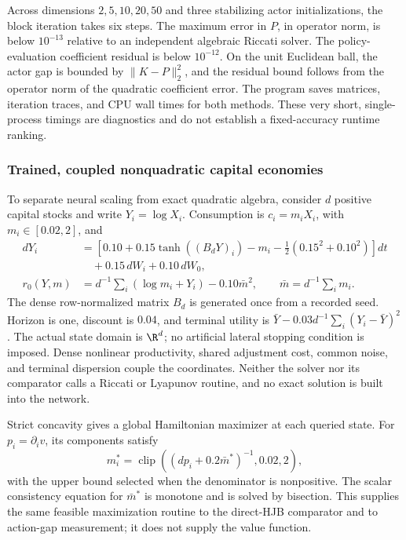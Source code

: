 Across dimensions $2,5,10,20,50$ and three stabilizing actor initializations, the block iteration takes six steps. The maximum error in $P$, in operator norm, is below $10^{-13}$ relative to an independent algebraic Riccati solver. The policy-evaluation coefficient residual is below $10^{-12}$. On the unit Euclidean ball, the actor gap is bounded by $\|K-P\|_2^2$, and the residual bound follows from the operator norm of the quadratic coefficient error. The program saves matrices, iteration traces, and CPU wall times for both methods. These very short, single-process timings are diagnostics and do not establish a fixed-accuracy runtime ranking.


\subsubsection{Trained, coupled nonquadratic capital economies}\label{sec:coupled-neural}
To separate neural scaling from exact quadratic algebra, consider $d$ positive capital stocks and write $Y_i=\log X_i$. Consumption is $c_i=m_iX_i$, with $m_i\in[0.02,2]$, and
\begin{align}\label{eq:coupled-r6}
 dY_i&=\left[0.10+0.15\tanh((B_dY)_i)-m_i-\tfrac12(0.15^2+0.10^2)\right]dt\nonumber\\
       &\quad+0.15\,dW_i+0.10\,dW_0,\\
 r_0(Y,m)&=d^{-1}\sum_i(\log m_i+Y_i)-0.10\bar m^2,
 \qquad \bar m=d^{-1}\sum_i m_i.\nonumber
\end{align}
The dense row-normalized matrix $B_d$ is generated once from a recorded seed. Horizon is one, discount is $0.04$, and terminal utility is $\bar Y-0.03d^{-1}\sum_i(Y_i-\bar Y)^2$. The actual state domain is $\R^d$; no artificial lateral stopping condition is imposed. Dense nonlinear productivity, shared adjustment cost, common noise, and terminal dispersion couple the coordinates. Neither the solver nor its comparator calls a Riccati or Lyapunov routine, and no exact solution is built into the network.

Strict concavity gives a global Hamiltonian maximizer at each queried state. For $p_i=\partial_i v$, its components satisfy
\[
 m_i^*=\operatorname{clip}\left((dp_i+0.2\bar m^*)^{-1},0.02,2\right),
\]
with the upper bound selected when the denominator is nonpositive. The scalar consistency equation for $\bar m^*$ is monotone and is solved by bisection. This supplies the same feasible maximization routine to the direct-HJB comparator and to action-gap measurement; it does not supply the value function.

